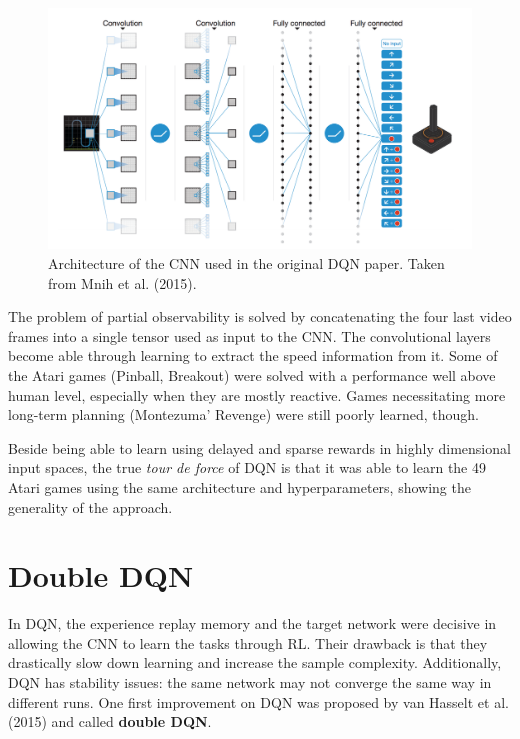 \documentclass[
  letterpaper,
  DIV=11,
  numbers=noendperiod]{scrreprt}
\begin{document}
\begin{figure}

{\centering \includegraphics{./img/dqn.png}

}

\caption{\label{fig-dqn}Architecture of the CNN used in the original DQN
paper. Taken from Mnih et al. (2015).}

\end{figure}

The problem of partial observability is solved by concatenating the four
last video frames into a single tensor used as input to the CNN. The
convolutional layers become able through learning to extract the speed
information from it. Some of the Atari games (Pinball, Breakout) were
solved with a performance well above human level, especially when they
are mostly reactive. Games necessitating more long-term planning
(Montezuma' Revenge) were still poorly learned, though.

Beside being able to learn using delayed and sparse rewards in highly
dimensional input spaces, the true \emph{tour de force} of DQN is that
it was able to learn the 49 Atari games using the same architecture and
hyperparameters, showing the generality of the approach.

\hypertarget{double-dqn}{%
\section{Double DQN}\label{double-dqn}}

In DQN, the experience replay memory and the target network were
decisive in allowing the CNN to learn the tasks through RL. Their
drawback is that they drastically slow down learning and increase the
sample complexity. Additionally, DQN has stability issues: the same
network may not converge the same way in different runs. One first
improvement on DQN was proposed by van Hasselt et al. (2015) and called
\textbf{double DQN}.
\end{document}
